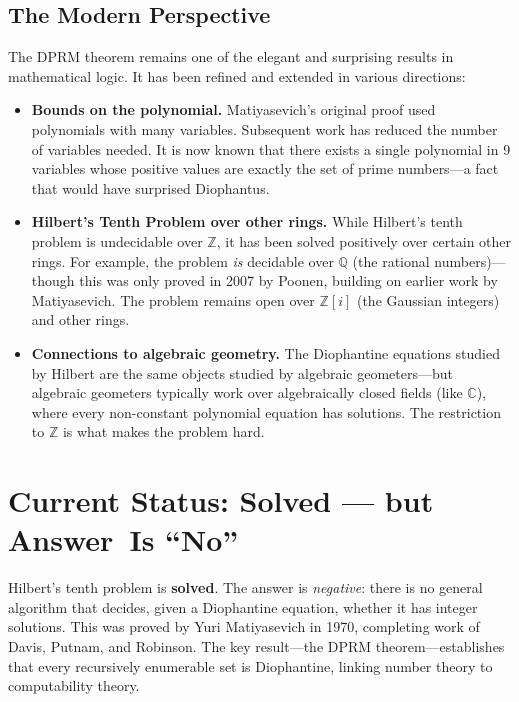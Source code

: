 \subsection{The Modern Perspective}

The DPRM theorem remains one of the elegant and surprising results in mathematical logic. It has been refined and extended in various directions:

\begin{itemize}
    \item \textbf{Bounds on the polynomial.} Matiyasevich's original proof used polynomials with many variables. Subsequent work has reduced the number of variables needed. It is now known that there exists a single polynomial in 9 variables whose positive values are exactly the set of prime numbers---a fact that would have surprised Diophantus.

    \item \textbf{Hilbert's Tenth Problem over other rings.} While Hilbert's tenth problem is undecidable over $\mathbb{Z}$, it has been solved positively over certain other rings. For example, the problem \emph{is} decidable over $\mathbb{Q}$ (the rational numbers)---though this was only proved in 2007 by Poonen, building on earlier work by Matiyasevich. The problem remains open over $\mathbb{Z}[i]$ (the Gaussian integers) and other rings.

    \item \textbf{Connections to algebraic geometry.} The Diophantine equations studied by Hilbert are the same objects studied by algebraic geometers---but algebraic geometers typically work over algebraically closed fields (like $\mathbb{C}$), where every non-constant polynomial equation has solutions. The restriction to $\mathbb{Z}$ is what makes the problem hard.
\end{itemize}

\section{Current Status: Solved --- but Answer~Is ``No''}

\begin{solvedbox}
Hilbert's tenth problem is \textbf{solved}. The answer is \emph{negative}: there is no general algorithm that decides, given a Diophantine equation, whether it has integer solutions. This was proved by Yuri Matiyasevich in 1970, completing work of Davis, Putnam, and Robinson. The key result---the DPRM theorem---establishes that every recursively enumerable set is Diophantine, linking number theory to computability theory.
\end{solvedbox}

